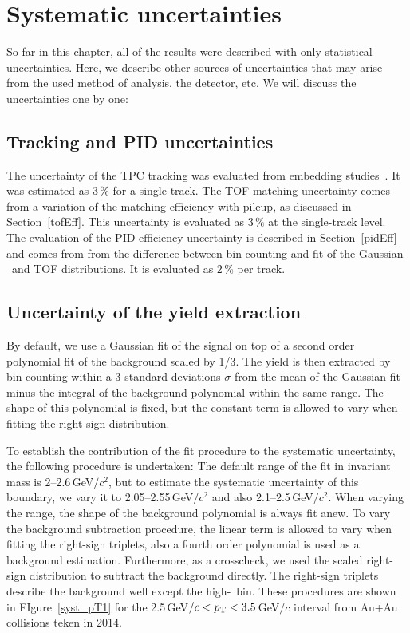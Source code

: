 \section{Systematic uncertainties}

So far in this chapter, all of the results were described with only statistical uncertainties. Here, we describe other sources of uncertainties that may arise from the used method of analysis, the detector, etc. We will discuss the uncertainties one by one:

\subsection{Tracking and PID uncertainties}
The uncertainty of the TPC tracking was evaluated from embedding studies~\cite{D0paper}. It was estimated as 3$\,\%$ for a single track. The TOF-matching uncertainty comes from a variation of the matching efficiency with pileup, as discussed in Section~\ref{tofEff}\@. This uncertainty is evaluated as 3$\,\%$ at the single-track level. The evaluation of the PID efficiency uncertainty is described in Section~\ref{pidEff} and comes from from the difference between bin counting and fit of the Gaussian \dedx\ and TOF distributions. It is evaluated as $2\,\%$ per track.


\subsection{Uncertainty of the yield extraction}
By default,  we use a Gaussian fit of the signal on top of a second order polynomial fit of the background scaled by 1/3\@. The yield is then extracted by bin counting within a 3 standard deviations $\sigma$ from the mean of the Gaussian fit minus the integral of the background polynomial within the same range. The shape of this polynomial is fixed, but the constant term is allowed to vary when fitting the right-sign distribution.

To establish the contribution of the fit procedure to the systematic uncertainty, the following procedure is undertaken: The default range of the fit in invariant mass is 2--2.6$\,$GeV$/c^2$, but to estimate the systematic uncertainty of this boundary, we vary it to  2.05--2.55$\,$GeV$/c^2$ and also 2.1--2.5$\,$GeV$/c^2$\@.  When varying the range, the shape of the background polynomial is always fit anew. To vary the background subtraction procedure, the linear term is allowed to vary when fitting the right-sign triplets, also a fourth order polynomial is used as a background estimation. Furthermore, as a crosscheck, we used the scaled right-sign distribution to subtract the background directly. The right-sign triplets describe the background well except the high-\pt\ bin. These procedures are shown in FIgure~\ref{syst_pT1} for the 2.5$\,$GeV$/c < {p_{\mathrm{T}}} < 3.5\,$GeV$/c$ interval from Au+Au collisions teken in 2014\@.

